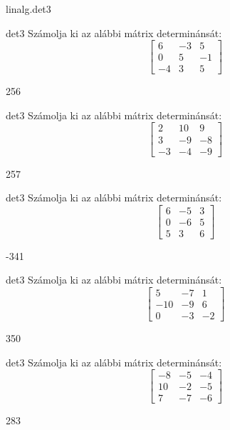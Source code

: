 \documentclass[12pt]{article}
\begin{document}
\begin{quiz}{linalg.det3}\begin{numerical}{det3}
Számolja ki az alábbi mátrix determinánsát:
$$\left[\begin{array}{ccc}6& -3& 5\\ 0& 5& -1\\ -4& 3& 5\end{array}\right]$$

\item 256
\end{numerical}


\begin{numerical}{det3}
Számolja ki az alábbi mátrix determinánsát:
$$\left[\begin{array}{ccc}2& 10& 9\\ 3& -9& -8\\ -3& -4& -9\end{array}\right]$$

\item 257
\end{numerical}


\begin{numerical}{det3}
Számolja ki az alábbi mátrix determinánsát:
$$\left[\begin{array}{ccc}6& -5& 3\\ 0& -6& 5\\ 5& 3& 6\end{array}\right]$$

\item -341
\end{numerical}


\begin{numerical}{det3}
Számolja ki az alábbi mátrix determinánsát:
$$\left[\begin{array}{ccc}5& -7& 1\\ -10& -9& 6\\ 0& -3& -2\end{array}\right]$$

\item 350
\end{numerical}


\begin{numerical}{det3}
Számolja ki az alábbi mátrix determinánsát:
$$\left[\begin{array}{ccc}-8& -5& -4\\ 10& -2& -5\\ 7& -7& -6\end{array}\right]$$

\item 283
\end{numerical}



\end{quiz}
\end{document}
